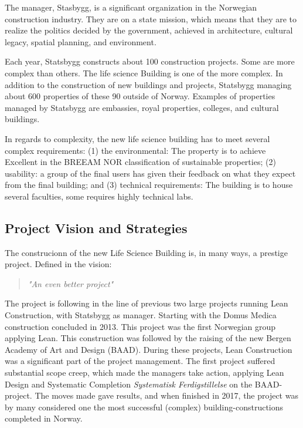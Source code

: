 The manager, Stasbygg, is a significant organization in the Norwegian construction industry. They are on a state mission, which means that they are to realize the politics decided by the government, achieved in architecture, cultural legacy, spatial planning, and environment. 

Each year, Statsbygg constructs about 100 construction projects. Some are more complex than others. The life science Building is one of the more complex. In addition to the construction of new buildings and projects, Statsbygg managing about 600 properties of these 90 outside of Norway. Examples of properties managed by Statsbygg are embassies, royal properties, colleges, and cultural buildings. 

In regards to complexity, the new life science building has to meet several complex requirements: (1) the environmental: The property is to achieve Excellent in the BREEAM NOR classification of sustainable properties; (2) usability: a group of the final users has given their feedback on what they expect from the final building; and (3) technical requirements: The building is to house several faculties, some requires highly technical labs.

\subsection{Project Vision and Strategies} \label{sec:strategy}
The construcionn of the new Life Science Building is, in many ways, a prestige project. Defined in the vision:
\begin{quote}
    \textit{"An even better project"}
\end{quote}
The project is following in the line of previous two large projects running Lean Construction, with Statsbygg as manager. Starting with the Domus Medica construction concluded in 2013. This project was the first Norwegian group applying Lean. This construction was followed by the raising of the new Bergen Academy of Art and Design (BAAD). During these projects, Lean Construction was a significant part of the project management. The first project suffered substantial scope creep, which made the managers take action, applying Lean Design and Systematic Completion \textit{Systematisk Ferdigstillelse} on the BAAD-project. The moves made gave results, and when finished in 2017, the project was by many considered one the most successful (complex) building-constructions completed in Norway.

